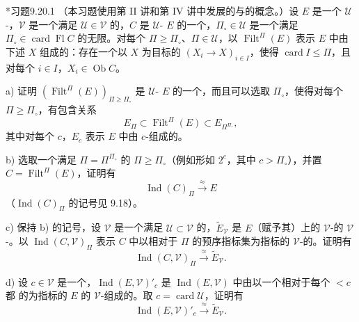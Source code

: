\begin{SGAresult}{*习题}{9.20.1}
（本习题使用第 II 讲和第 IV 讲中发展的与的概念。）设 $E$ 是一个 $\mathcal U$-，$\mathcal V$ 是一个满足 $\mathcal U\in\mathcal V$ 的，$C$ 是 $\mathcal U$- $E$ 的一个，$\Pi_\circ\in\mathcal U$ 是一个满足 $\Pi_\circ\in\operatorname{card}\operatorname{Fl}C$ 的无限。对每个 $\Pi\geq\Pi_\circ$、$\Pi\in\mathcal U$，以 $\operatorname{Filt}^\Pi(E)$ 表示 $E$ 中由下述 $X$ 组成的：存在一个以 $X$ 为目标的 $(X_i\to X)_{i\in I}$，使得 $\operatorname{card}I\leq\Pi$，且对每个 $i\in I$，$X_i\in\operatorname{Ob}C$。

a) 证明 $(\operatorname{Filt}^\Pi(E))_{\Pi\geq\Pi_\circ}$ 是 $\mathcal U$- $E$ 的一个，而且可以选取 $\Pi_\circ$，使得对每个 $\Pi\geq\Pi_\circ$，有包含关系
\[
E_\Pi\subset\operatorname{Filt}^\Pi(E)\subset E_{\Pi^{\Pi_\circ}},
\]
其中对每个 $c$，$E_c$ 表示 $E$ 中由 $c$-组成的。

b) 选取一个满足 $\Pi=\Pi^{\Pi_\circ}$ 的 $\Pi\geq\Pi_\circ$（例如形如 $2^c$，其中 $c>\Pi_\circ$），并置 $C=\operatorname{Filt}^\Pi(E)$，证明有
\[
\operatorname{Ind}(C)_\Pi\xrightarrow{\approx}E
\]
（$\operatorname{Ind}(C)_\Pi$ 的记号见 9.18）。

c) 保持 b) 的记号，设 $\mathcal V$ 是一个满足 $\mathcal U\subset\mathcal V$ 的，$\widetilde E_{\mathcal V}$ 是 $E$（赋予其）上的 $\mathcal V$-的 $\mathcal V$-。以 $\operatorname{Ind}(C,\mathcal V)_\Pi$ 表示 $C$ 中以相对于 $\Pi$  的预序指标集为指标的 $\mathcal V$-的。证明有
\[
\operatorname{Ind}(C,\mathcal V)_\Pi\xrightarrow{\approx}\widetilde E_{\mathcal V}.
\]

d) 设 $c\in\mathcal V$ 是一个，$\operatorname{Ind}(E,\mathcal V)'_c$ 是 $\operatorname{Ind}(E,\mathcal V)$ 中由以一个相对于每个 $<c$ 都 的为指标的 $E$ 的 $\mathcal V$-组成的。取 $c=\operatorname{card}\mathcal U$，证明有
\[
\operatorname{Ind}(E,\mathcal V)'_c\xrightarrow{\approx}\widetilde E_{\mathcal V}.
\]
\hfill *
\end{SGAresult}

